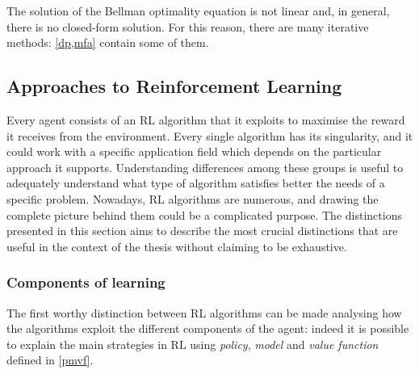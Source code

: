The solution of the Bellman optimality equation is not linear and, in general, there is no closed-form solution.
For this reason, there are many iterative methods: \vref{dp,mfa} contain some of them.


\subsection{Approaches to Reinforcement Learning} \label{approaches}

Every agent consists of an RL algorithm that it exploits to maximise the reward it receives from the environment.
Every single algorithm has its singularity, and it could work with a specific application field which depends on the particular approach it supports.
Understanding differences among these groups is useful to adequately understand what type of algorithm satisfies better the needs of a specific problem.
Nowadays, RL algorithms are numerous, and drawing the complete picture behind them could be a complicated purpose.
The distinctions presented in this section aims to describe the most crucial distinctions that are useful in the context of the thesis without claiming to be exhaustive.

\subsubsection{Components of learning}

The first worthy distinction between RL algorithms can be made analysing how the algorithms exploit the different components of the agent: indeed it is possible to explain the main strategies in RL using \textit{policy}, \textit{model} and \textit{value function} defined in \vref{pmvf}.


